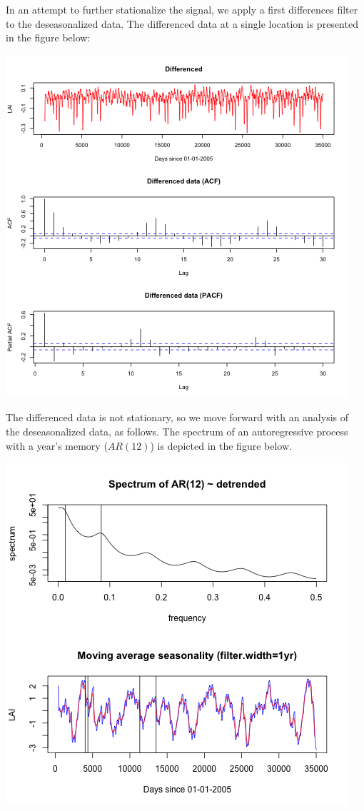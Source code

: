 \documentclass[11pt]{article}
\begin{document}
In an attempt to further stationalize the signal, we apply a first differences
filter to the deseasonalized data.  The differenced data at a single location is
presented in the figure below:

\includegraphics[width=\textwidth]{../img/differenced_acf_pacf.png}

The differenced data is not stationary, so we move forward with an analysis of
the deseasonalized data, as follows. The spectrum of an autoregressive process
with a year's memory ($AR(12)$) is depicted in the figure below.

\includegraphics[width=\textwidth]{../img/deseasonalization_spectrum.png}
\end{document}
